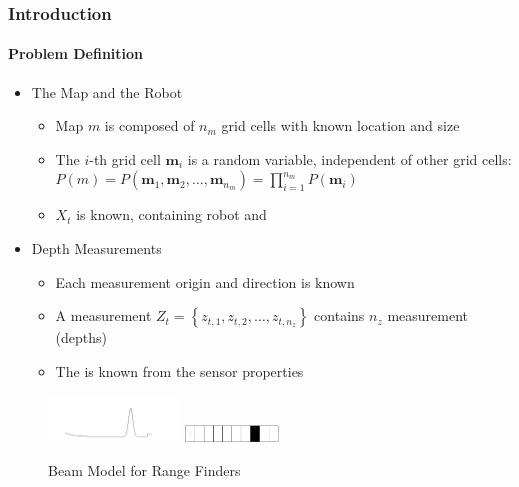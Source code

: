 \documentclass[11pt,professionalfonts,hyperref={pdftex,pdfpagemode=none,pdfstartview=FitH}]{beamer}
\newcommand{\braces}[1]{\ensuremath{\left\{ #1 \right\}}}
\renewcommand{\emph}[1]{\textit{\textbf{\color{blue}{#1}}}}
\begin{document}
\begin{frame}
\frametitle{Introduction}
\framesubtitle{Problem Definition}

\begin{itemize}
	\item The Map and the Robot
	\begin{itemize}
	\item Map $m$ is composed of $n_m$ grid cells with known location and size
	\item The $i$-th grid cell $\mathbf{m}_i$ is a \emph{static binary} random variable, independent of other grid cells: $P(m)=P(\mathbf{m}_1,\mathbf{m}_2,\ldots,\mathbf{m}_{n_m})=\prod_{i=1}^{n_m}P(\mathbf{m}_i)$
	\item \emph{Pose} $X_t$ is known, containing robot \emph{position} and \emph{attitude}
	\end{itemize}
\vspace*{0.0cm}\pause
\end{itemize}
\begin{minipage}[t]{7.0cm}
\begin{itemize}
	\item Depth Measurements
	\begin{itemize}
	\item Each measurement origin and direction is known \emph{deterministically}
	\item A measurement \emph{scan} $Z_t=\braces{z_{t,1},z_{t,2},\ldots,z_{t,n_z}}$ contains $n_z$ measurement \emph{rays} (depths)%
\item The \emph{forward sensor model} is known from the sensor properties
\end{itemize}
\end{itemize}
\end{minipage}
\begin{minipage}[t]{3.0cm}
\hspace*{0.25cm}
\begin{figure}[!htbp]
\vspace*{-0.25cm}
\centerline{
    \includegraphics[width=3.5cm]{BeamModel.png}\hspace*{0.1cm}
    }
\vspace*{0.25cm}
\centerline{
    \includegraphics[width=2.5cm]{1D_True_Grid.png}\hspace*{0.1cm}
    }
{Beam Model for Range Finders}
\end{figure}

\end{minipage}



\end{frame}
\end{document}
